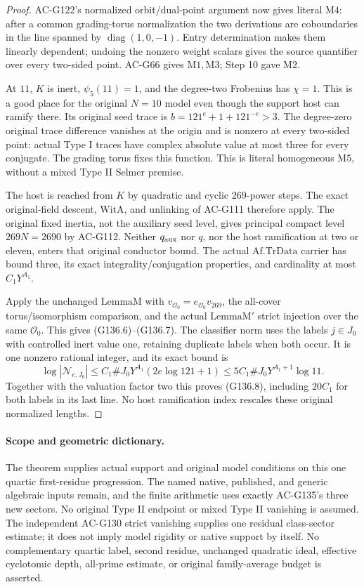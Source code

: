 \begin{proof}
AC-G122's normalized orbit/dual-point argument now gives
literal \(\mathrm{M4}\): after a common grading-torus
normalization the two derivations are coboundaries in
the line spanned by \(\operatorname{diag}(1,0,-1)\).
Entry determination makes them linearly dependent;
undoing the nonzero weight scalars gives the source
quantifier over every two-sided point.
AC-G66 gives \(\mathrm{M1},\mathrm{M3}\); Step 10 gave
\(\mathrm{M2}\).

At \(11\), \(K\) is inert, \(\psi_5(11)=1\), and the
degree-two Frobenius has \(\chi=1\).  This is a good
place for the original \(N=10\) model even though the
support host can ramify there.
Its original seed trace is
\(b=121^e+1+121^{-e}>3\).
The degree-zero original trace difference vanishes at
the origin and is nonzero at every two-sided point:
actual Type I traces have complex absolute value at
most three for every conjugate.  The grading torus
fixes this function.  This is literal homogeneous
\(\mathrm{M5}\), without a mixed Type II Selmer premise.

The host is reached from \(K\) by quadratic and cyclic
\(269\)-power steps.  The exact original-field descent,
\(\mathrm{WitA}\), and unlinking of AC-G111 therefore
apply.  The original fixed inertia, not the auxiliary
seed level, gives principal compact level
\(269N=2690\) by AC-G112.
Neither \(q_{\rm aux}\) nor \(q\), nor the host
ramification at two or eleven, enters that original
conductor bound.
The actual \(\mathrm{Af.TrData}\) carrier has bound
three, its exact integrality/conjugation properties,
and cardinality at most \(C_1Y^{A_1}\).

Apply the unchanged \(\mathrm{LemmaM}\) with
\(v_{\mathcal O_0}=e_{\mathcal O_0}v_{269}\), the
all-cover torus/isomorphism comparison, and the actual
\(\mathrm{LemmaM'}\) strict injection over the same
\(\mathcal O_0\).  This gives (G136.6)--(G136.7).
The classifier norm uses the labels \(j\in J_0\) with
controlled inert value one, retaining duplicate labels
when both occur.  It is one nonzero rational integer,
and its exact bound is
\[
 \log|\mathcal N_{e,J_0}|
 \le C_1\#J_0Y^{A_1}(2e\log121+1)
 \le5C_1\#J_0Y^{A_1+1}\log11.
 \tag{G136.32}
\]
Together with the valuation factor two this proves
(G136.8), including \(20C_1\) for both labels in its
last line.  No host ramification index rescales these
original normalized lengths.
\end{proof}

\paragraph{Scope and geometric dictionary.}
The theorem supplies actual support and original model
conditions on this one quartic first-residue progression.
The named native, published, and generic algebraic inputs
remain, and the finite arithmetic uses exactly AC-G135's
three new sectors.  No original Type II endpoint or mixed
Type II vanishing is assumed.
The independent AC-G130 strict vanishing supplies one
residual class-sector estimate; it does not imply model
rigidity or native support by itself.
No complementary quartic label, second residue, unchanged
quadratic ideal, effective cyclotomic depth, all-prime
estimate, or original family-average budget is asserted.

